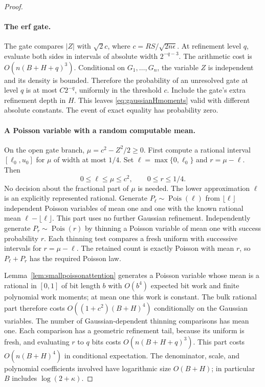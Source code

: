 \begin{proof}
\paragraph{The erf gate.}
The gate compares $|Z|$ with $\sqrt2 c$, where
$c=RS/\sqrt{2n\epsilon}$. At refinement level $q$, evaluate both sides
in intervals of absolute width $2^{-q-3}$. The arithmetic cost is
$O(n(B+H+q)^3)$. Conditional on $G_1,\ldots,G_n$, the variable $Z$ is
independent and its density is bounded. Therefore the probability of
an unresolved gate at level $q$ is at most $C2^{-q}$, uniformly in the
threshold $c$. Include the gate's extra refinement depth in $H$.
This leaves \eqref{eq:gaussianHmoments} valid with different absolute
constants. The event of exact equality has probability zero.

\paragraph{A Poisson variable with a random computable mean.}
On the open gate branch, $\mu=c^2-Z^2/2\ge0$. First compute a rational
interval $[\ell_0,u_0]$ for $\mu$ of width at most $1/4$. Set
$\ell=\max\{0,\ell_0\}$ and $r=\mu-\ell$. Then
\[
 0\le\ell\le\mu\le c^2,\qquad 0\le r\le1/4.
\]
No decision about the fractional part of $\mu$ is needed. The lower
approximation $\ell$ is an explicitly represented rational. Generate
$P_\ell\sim\operatorname{Pois}(\ell)$ from $\lfloor\ell\rfloor$
independent Poisson variables of mean one and one with the known rational
mean $\ell-\lfloor\ell\rfloor$. This part uses no further Gaussian
refinement. Independently generate $P_r\sim\operatorname{Pois}(r)$ by
thinning a Poisson variable of mean one with success probability $r$.
Each thinning test compares a fresh uniform with successive intervals
for $r=\mu-\ell$. The retained count is exactly Poisson with mean $r$,
so $P_\ell+P_r$ has the required Poisson law.

Lemma~\ref{lem:smallpoissonattention} generates a Poisson variable
whose mean is a rational in $[0,1]$ of bit length $b$ with $O(b^4)$
expected bit work and finite polynomial work moments; at mean one this
work is constant. The bulk rational part therefore costs
$O((1+c^2)(B+H)^4)$ conditionally on the Gaussian variables. The number
of Gaussian-dependent thinning comparisons has mean one. Each comparison
has a geometric refinement tail, because its uniform is fresh, and
evaluating $r$ to $q$ bits costs $O(n(B+H+q)^3)$. This part costs
$O(n(B+H)^4)$ in conditional expectation. The denominator, scale, and
polynomial coefficients involved have logarithmic size $O(B+H)$;
in particular $B$ includes $\log(2+\kappa)$.


\end{proof}
